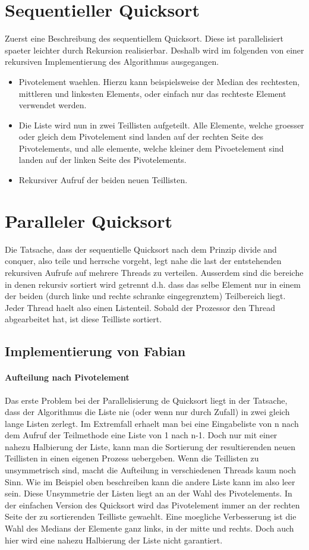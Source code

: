 \documentclass[12pt,twoside,a4paper]{article}
\begin{document}
\section{Sequentieller Quicksort}
Zuerst eine Beschreibung des sequentiellem Quicksort. Diese ist parallelisiert spaeter leichter durch Rekursion realisierbar. Deshalb wird im folgenden von einer rekursiven Implementierung des Algorithmus ausgegangen. 
\begin{itemize}
	\item Pivotelement waehlen. Hierzu kann beispielsweise der Median des rechtesten, mittleren und linkesten Elements, oder einfach nur das rechteste Element verwendet werden.
	\item Die Liste wird nun in zwei Teillisten aufgeteilt. Alle Elemente, welche groesser oder gleich dem Pivotelement sind landen auf der rechten Seite des Pivotelements, und alle elemente, welche kleiner dem Pivoetelement sind landen auf der linken Seite des Pivotelements.
	\item Rekursiver Aufruf der beiden neuen Teillisten.
\end{itemize}

\section{Paralleler Quicksort}
Die Tatsache, dass der sequentielle Quicksort nach dem Prinzip divide and conquer, also teile und herrsche vorgeht, legt nahe die last der entstehenden rekursiven Aufrufe auf mehrere Threads zu verteilen.
Ausserdem sind die bereiche in denen rekursiv sortiert wird getrennt d.h. dass das selbe Element nur in einem der beiden (durch linke und rechte schranke eingegrenztem) Teilbereich liegt.
Jeder Thread haelt also einen Listenteil. Sobald der Prozessor den Thread abgearbeitet hat, ist diese Teilliste sortiert.

\subsection{Implementierung von Fabian}
\paragraph{Aufteilung nach Pivotelement}
Das erste Problem bei der Parallelisierung de Quicksort liegt in der Tatsache, dass der Algorithmus die Liste nie (oder wenn nur durch Zufall) in zwei gleich lange Listen zerlegt. Im Extremfall erhaelt man bei eine Eingabeliste von n nach dem Aufruf der Teilmethode eine Liste von 1 nach n-1. Doch nur mit einer nahezu Halbierung der Liste, kann man die Sortierung der resultierenden neuen Teillisten in einen eigenen Prozess uebergeben. Wenn die Teillisten zu unsymmetrisch sind, macht die Aufteilung in verschiedenen Threads kaum noch Sinn. Wie im Beispiel oben beschreiben kann die andere Liste kann im also leer sein. Diese Unsymmetrie der Listen liegt an an der Wahl des Pivotelements. In der einfachen Version des Quicksort wird das Pivotelement immer an der rechten Seite der zu sortierenden Teilliste gewaehlt. Eine moegliche Verbesserung ist die Wahl des Medians der Elemente ganz links, in der mitte und rechts. Doch auch hier wird eine nahezu Halbierung der Liste nicht garantiert.
\end{document}
